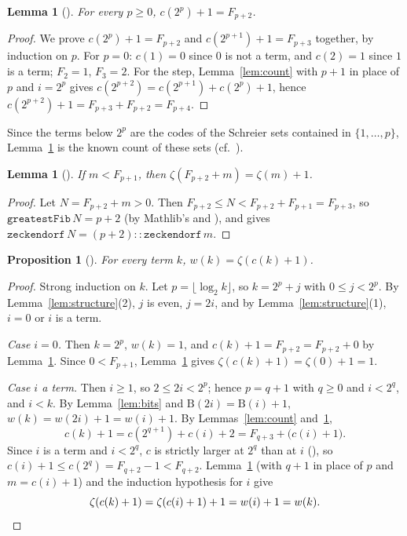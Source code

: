 \documentclass[11pt]{amsart}
\theoremstyle{plain}
\newtheorem{lemma}[theorem]{Lemma}
\newtheorem{proposition}[theorem]{Proposition}
\theoremstyle{definition}
\newcommand{\Bits}{\mathrm{B}}
\begin{document}
\begin{lemma}[]\label{lem:fib}
For every $p\ge0$, $c(2^p)+1=F_{p+2}$.
\end{lemma}

\begin{proof}
We prove $c(2^p)+1=F_{p+2}$ and $c(2^{p+1})+1=F_{p+3}$ together, by induction on $p$. For $p=0$: $c(1)=0$ since $0$ is not a term, and $c(2)=1$ since $1$ is a term; $F_2=1$, $F_3=2$. For the step, Lemma~\ref{lem:count} with $p+1$ in place of $p$ and $i=2^p$ gives $c(2^{p+2})=c(2^{p+1})+c(2^p)+1$, hence $c(2^{p+2})+1=F_{p+3}+F_{p+2}=F_{p+4}$.
\end{proof}

Since the terms below $2^p$ are the codes of the Schreier sets contained in $\{1,\dots,p\}$, Lemma~\ref{lem:fib} is the known count of these sets (cf.\ \cite{Chu,Bird}).

\begin{lemma}[]\label{lem:zeck}
If $m<F_{p+1}$, then $\zeta(F_{p+2}+m)=\zeta(m)+1$.
\end{lemma}

\begin{proof}
Let $N=F_{p+2}+m>0$. Then $F_{p+2}\le N<F_{p+2}+F_{p+1}=F_{p+3}$, so $\mathtt{greatestFib}\,N=p+2$ (by Mathlib's  and ), and  gives $\mathtt{zeckendorf}\,N=(p+2)::\mathtt{zeckendorf}\,m$.
\end{proof}

\begin{proposition}[]\label{prop:main}
For every term $k$, $w(k)=\zeta(c(k)+1)$.
\end{proposition}

\begin{proof}
Strong induction on $k$. Let $p=\lfloor\log_2k\rfloor$, so $k=2^p+j$ with $0\le j<2^p$. By Lemma~\ref{lem:structure}(2), $j$ is even, $j=2i$, and by Lemma~\ref{lem:structure}(1), $i=0$ or $i$ is a term.

\emph{Case $i=0$.} Then $k=2^p$, $w(k)=1$, and $c(k)+1=F_{p+2}=F_{p+2}+0$ by Lemma~\ref{lem:fib}. Since $0<F_{p+1}$, Lemma~\ref{lem:zeck} gives $\zeta(c(k)+1)=\zeta(0)+1=1$.

\emph{Case $i$ a term.} Then $i\ge1$, so $2\le2i<2^p$; hence $p=q+1$ with $q\ge0$ and $i<2^q$, and $i<k$. By Lemma~\ref{lem:bits} and $\Bits(2i)=\Bits(i)+1$, $w(k)=w(2i)+1=w(i)+1$. By Lemmas~\ref{lem:count} and~\ref{lem:fib},
\[
c(k)+1=c(2^{q+1})+c(i)+2=F_{q+3}+\bigl(c(i)+1\bigr).
\]
Since $i$ is a term and $i<2^q$, $c$ is strictly larger at $2^q$ than at $i$ (), so $c(i)+1\le c(2^q)=F_{q+2}-1<F_{q+2}$. Lemma~\ref{lem:zeck} (with $q+1$ in place of $p$ and $m=c(i)+1$) and the induction hypothesis for $i$ give
\[
\zeta(c(k)+1)=\zeta(c(i)+1)+1=w(i)+1=w(k).\qedhere
\]
\end{proof}
\end{document}
